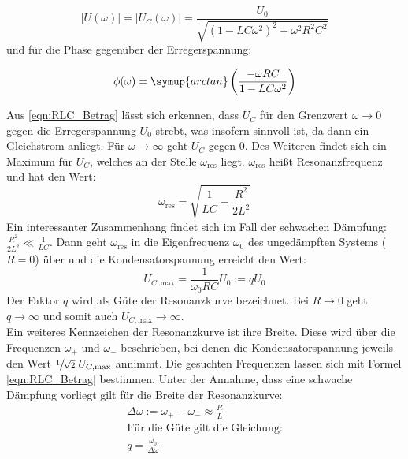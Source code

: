 \begin{equation}
    \label{eqn:RLC_Betrag}
    |U(\omega)| = |U_C(\omega)| = \frac{U_0}{\sqrt{(1-LC\omega^2)^2+\omega^2R^2C^2}}
\end{equation}
und für die Phase gegenüber der Erregerspannung:

\begin{equation}
    \label{eqn:RLC_Phase}
    \phi(\omega) = \symup{arctan}\left(\frac{-\omega RC}{1-LC\omega^2}\right)
\end{equation}

Aus \eqref{eqn:RLC_Betrag} lässt sich erkennen, dass $U_C$ für den Grenzwert $\omega \to 0$ gegen die Erregerspannung $U_0$
strebt, was insofern sinnvoll ist, da dann ein Gleichstrom anliegt. Für $\omega \to \infty$ geht $U_C$ gegen 0.
Des Weiteren findet sich ein Maximum für $U_C$, welches an der Stelle $\omega_{\text{res}}$ liegt.
$\omega_{\text{res}}$ heißt Resonanzfrequenz und hat den Wert:
\begin{equation}
    \label{eqn:Resonanzfrequenz}
    \omega_{\text{res}} = \sqrt{\frac{1}{LC}-\frac{R^2}{2L^2}}
\end{equation}
Ein interessanter Zusammenhang findet sich im Fall der schwachen Dämpfung: $\frac{R^2}{2L^2} \ll \frac{1}{LC}$. Dann geht $\omega_{\text{res}}$ 
in die Eigenfrequenz $\omega_0$ des ungedämpften Systems  ($R = 0$) über und die Kondensatorspannung erreicht den Wert: 
\begin{equation}
    \label{eqn:Guete_Resonanzkurve}
    U_{C, \text{max}} = \frac{1}{\omega_0 RC} U_0 := q U_0
\end{equation}
Der Faktor $q$ wird als Güte der Resonanzkurve bezeichnet. Bei $R \to 0$ geht \\ $q \to \infty$ und somit auch $U_{C, \text{max}} \to \infty$. \\
Ein weiteres Kennzeichen der Resonanzkurve ist ihre Breite. Diese wird über die Frequenzen $\omega_+$ und $\omega_-$ beschrieben, bei denen
die Kondensatorspannung jeweils den Wert $\sfrac{1}{\sqrt{2}}\; U_{C,\text{max}}$ annimmt. Die gesuchten Frequenzen lassen sich mit Formel
\eqref{eqn:RLC_Betrag} bestimmen. Unter der Annahme, dass eine schwache Dämpfung vorliegt gilt für die Breite der Resonanzkurve:
\begin{gather}
    \Delta\omega := \omega_+ - \omega_- \approx \frac{R}{L} \label{eqn:DeltaOmega} \\
    \text{Für die Güte gilt die Gleichung:} \nonumber \\
    q = \frac{\omega_0}{\Delta\omega}                       \label{eqn:Guete_Resonanzkurve2}
\end{gather}

